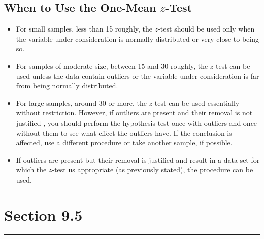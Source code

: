 \documentclass[12pt]{article}
\begin{document}
        \subsection*{When to Use the One-Mean $z$-Test}
            \begin{itemize}
                \item For small samples, less than 15 roughly, the $z$-test should be used
                only when the variable under consideration is normally distributed or very
                close to being so.
                \item For samples of moderate size, between 15 and 30 roughly, the $z$-test
                can be used unless the data contain outliers or the variable under
                consideration is far from being normally distributed.
                \item For large samples, around 30 or more, the $z$-test can be used
                essentially without restriction. However, if outliers are present and their
                removal is not justified , you should perform the hypothesis test once with
                outliers and once without them to see what effect the outliers have. If the
                conclusion is affected, use a different procedure or take another sample,
                if possible.
                \item If outliers are present but their removal is justified and result in
                a data set for which the $z$-test us appropriate (as previously stated),
                the procedure can be used.                
            \end{itemize}

    \section*{Section 9.5}
    \noindent\rule{\textwidth}{0.4pt}
\end{document}
